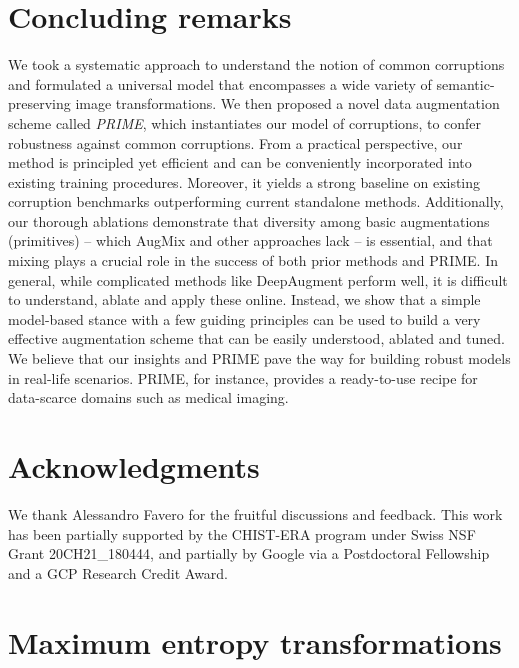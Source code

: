 \documentclass[runningheads]{llncs}
\begin{document}
\section{Concluding remarks}


We took a systematic approach to understand the notion of common corruptions and formulated a universal model that encompasses a wide variety of semantic-preserving image transformations. We then proposed a novel data augmentation scheme called \textit{PRIME}, which instantiates our model of corruptions, to confer robustness against common corruptions. From a practical perspective, our method is principled yet efficient and can be conveniently incorporated into existing training procedures. Moreover, it yields a strong baseline on existing corruption benchmarks outperforming current standalone methods. 
Additionally, our thorough ablations demonstrate that diversity among basic augmentations (primitives) -- which AugMix and other approaches lack -- is essential, and that mixing plays a crucial role in the success of both prior methods and PRIME.
In general, while complicated methods like DeepAugment perform well, it is difficult to understand, ablate and apply these online. Instead, we show that a simple model-based stance with a few guiding principles can be used to build a very effective augmentation scheme that can be easily understood, ablated and tuned.
We believe that our insights and PRIME pave the way for building robust models in real-life scenarios. PRIME, for instance, provides a ready-to-use recipe for data-scarce domains such as medical imaging.

\section*{Acknowledgments}


We thank Alessandro Favero for the fruitful discussions and feedback. This work has been partially supported by the CHIST-ERA program under Swiss NSF Grant 20CH21\_180444, and partially by Google via a Postdoctoral Fellowship and a GCP Research Credit Award.

\clearpage



\clearpage
\appendix

\section{Maximum entropy transformations}
\label{app:max-entropy}
\end{document}
